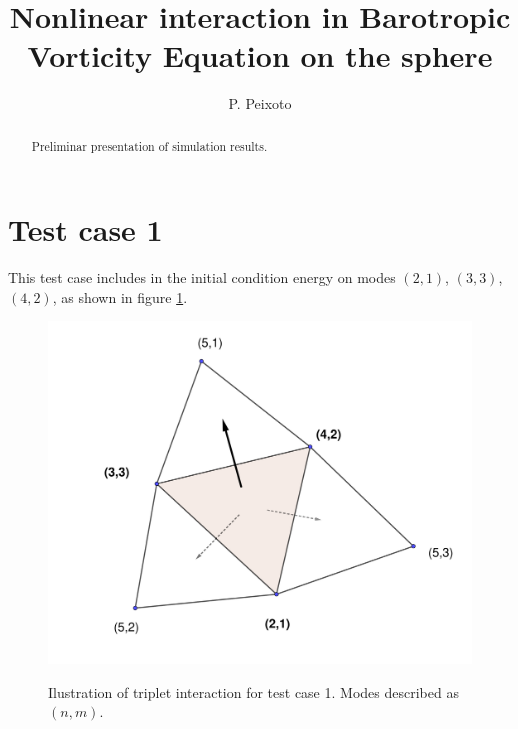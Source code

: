 \documentclass[a4paper,10pt]{article}
\title{Nonlinear interaction in Barotropic Vorticity Equation on the sphere}
\author{P. Peixoto}
\begin{document}
\maketitle

\begin{abstract}
Preliminar presentation of simulation results.
\end{abstract}

\section{Test case 1}

This test case includes in the initial condition energy on modes $(2,1)$, $(3,3)$, $(4,2)$, as shown in figure \ref{fig:tc-3-3-diagram}. 

\begin{figure}[h!]
\centering
 \includegraphics[scale=0.3]{figs/Nonlinear interaction diagram-TC-3-3.pdf}
 \label{fig:tc-3-3-diagram}
 \caption{Ilustration of triplet interaction for test case 1. Modes described as $(n,m)$.}
\end{figure}
\end{document}

